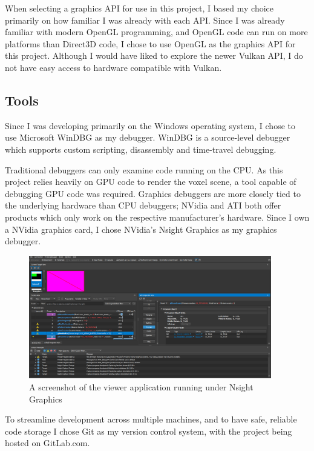 When selecting a graphics API for use in this project, I based my choice primarily on how familiar I was already with each API. Since I was already familiar with modern OpenGL programming, and OpenGL code can run on more platforms than Direct3D code, I chose to use OpenGL as the graphics API for this project. Although I would have liked to explore the newer Vulkan API, I do not have easy access to hardware compatible with Vulkan.

\subsection{Tools}\label{sec:tools}
Since I was developing primarily on the Windows operating system, I chose to use Microsoft WinDBG as my debugger. WinDBG is a source-level debugger which supports custom scripting, disassembly and time-travel debugging.

Traditional debuggers can only examine code running on the CPU. As this project relies heavily on GPU code to render the voxel scene, a tool capable of debugging GPU code was required. Graphics debuggers are more closely tied to the underlying hardware than CPU debuggers; NVidia and ATI both offer products which only work on the respective manufacturer's hardware. Since I own a NVidia graphics card, I chose NVidia's Nsight Graphics as my graphics debugger.

\begin{figure}[h]
    \centering
    \includegraphics[width=400px]{graphics/nsight_screenshot.png}
    \caption{A screenshot of the viewer application running under Nsight Graphics}
    \label{fig:nsight_screenshot}
\end{figure}

To streamline development across multiple machines, and to have safe, reliable code storage I chose Git as my version control system, with the project being hosted on GitLab.com. 

